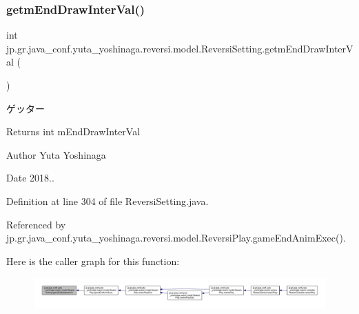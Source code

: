 \subsubsection{\texorpdfstring{getm\+End\+Draw\+Inter\+Val()}{getmEndDrawInterVal()}}
{\footnotesize\ttfamily int jp.\+gr.\+java\+\_\+conf.\+yuta\+\_\+yoshinaga.\+reversi.\+model.\+Reversi\+Setting.\+getm\+End\+Draw\+Inter\+Val (\begin{DoxyParamCaption}{ }\end{DoxyParamCaption})}



ゲッター 

\begin{DoxyReturn}{Returns}
int m\+End\+Draw\+Inter\+Val 
\end{DoxyReturn}
\begin{DoxyAuthor}{Author}
Yuta Yoshinaga 
\end{DoxyAuthor}
\begin{DoxyDate}{Date}
2018.. 
\end{DoxyDate}


Definition at line 304 of file Reversi\+Setting.\+java.



Referenced by jp.\+gr.\+java\+\_\+conf.\+yuta\+\_\+yoshinaga.\+reversi.\+model.\+Reversi\+Play.\+game\+End\+Anim\+Exec().

Here is the caller graph for this function\+:
\nopagebreak
\begin{figure}[H]
\begin{center}
\leavevmode
\includegraphics[width=350pt]{classjp_1_1gr_1_1java__conf_1_1yuta__yoshinaga_1_1reversi_1_1model_1_1_reversi_setting_af0024a8f8f725a80ddbaa9cac751e555_icgraph}
\end{center}
\end{figure}
\mbox{\label{classjp_1_1gr_1_1java__conf_1_1yuta__yoshinaga_1_1reversi_1_1model_1_1_reversi_setting_a35f2248862e0e35bc4eaec74b39a45a0}} 
